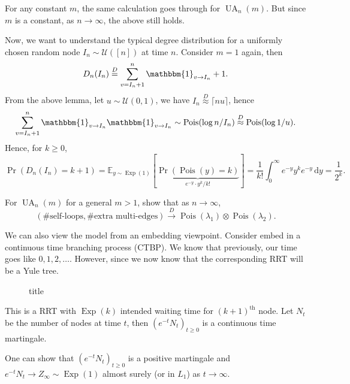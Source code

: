 \begin{remark}
	For any constant \(m\), the same calculation goes through for \(\operatorname{UA}_n(m) \). But since \(m\) is a constant, as \(n \to \infty \), the above still holds.
\end{remark}

Now, we want to understand the typical degree distribution for a uniformly chosen random node \(I_n \sim \mathcal{U} ([n])\) at time \(n\). Consider \(m = 1\) again, then
\[
	D_n(I_n)
	\overset{D}{=} \sum_{v=I_n + 1}^{n} \mathbbm{1}_{v \to I_n} + 1.
\]
From the above lemma, let \(u \sim \mathcal{U} (0, 1)\), we have \(I_n \overset{D}{\approx } \lceil n u \rceil \), hence
\[
	\sum_{v=I_n + 1}^{n} \mathbbm{1}_{v \to I_n} \mathbbm{1}_{v \to I_n}
	\sim \operatorname{Pois}(\log n / I_n)
	\overset{D}{\approx } \operatorname{Pois}(\log 1 / u).
\]
Hence, for \(k \geq 0\),
\[
	\Pr_{}\left(D_n(I_n) = k + 1\right)
	= \mathbb{E}_{y \sim \operatorname{Exp}(1) }[\underbrace{\Pr_{}(\operatorname{Pois}(y) = k )}_{e^{-y} \cdot y^k / k!}]
	= \frac{1}{k!} \int_{0}^{\infty} e^{-y} y^k e^{-y} \,\mathrm{d}y
	= \frac{1}{2^k}.
\]

\begin{exercise}
	For \(\operatorname{UA}_n(m) \) for a general \(m > 1\), show that as \(n \to \infty \),
	\[
		(\#\text{self-loops} , \#\text{extra multi-edges} )
		\overset{D}{\to} \operatorname{Pois}(\lambda _1) \otimes \operatorname{Pois}(\lambda _2) .
	\]
\end{exercise}

We can also view the model from an embedding viewpoint. Consider embed in a continuous time branching process (CTBP). We know that previously, our time goes like \(0, 1, 2, \dots \). However, since we now know that the corresponding RRT will be a Yule tree.

\begin{figure}[H]
	\centering
	\caption{title}
	\label{fig:CTBP}
\end{figure}

This is a RRT with \(\operatorname{Exp}(k) \) intended waiting time for \((k+1)^{\text{th} }\) node. Let \(N_t\) be the number of nodes at time \(t\), then \((e^{-t} N_t)_{t \geq 0}\) is a continuous time martingale.

\begin{note}
	One can show that \((e^{-t} N_t)_{t \geq 0}\) is a positive martingale and \(e^{-t} N_t \to Z_{\infty } \sim \operatorname{Exp}(1) \) almost surely (or in \(L_1\)) as \(t \to \infty \).
\end{note}

